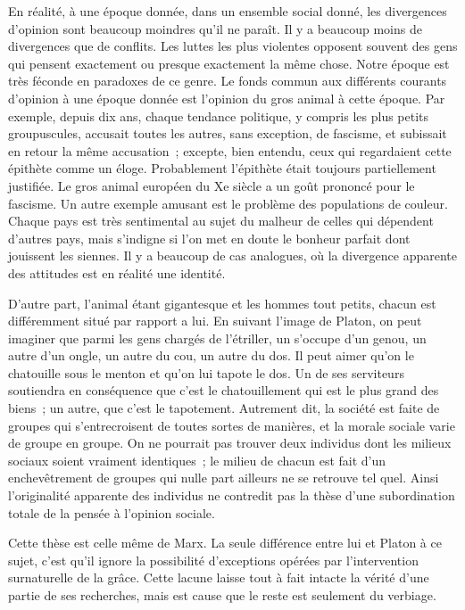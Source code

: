 \documentclass[french,twoside]{book} %
\begin{document}
En réalité, à une époque donnée, dans un ensemble social donné, les divergences d'opinion sont beaucoup moindres qu'il ne paraît. Il y a beaucoup moins de divergences que de conflits. Les luttes les plus violentes opposent souvent des gens qui pensent exactement ou presque exactement la même chose. Notre époque est très féconde en paradoxes de ce genre. Le fonds commun aux différents courants d'opinion à une époque donnée est l'opinion du gros animal à cette époque. Par exemple, depuis dix ans, chaque tendance politique, y compris les plus petits groupuscules, accusait toutes les autres, sans exception, de fascisme, et subissait en retour la même accusation ; excepte, bien entendu, ceux qui regardaient cette épithète comme un éloge. Probablement l'épithète était toujours partiellement justifiée. Le gros animal européen du Xe siècle a un goût prononcé pour le fascisme. Un autre exemple amusant est le problème des populations de couleur. Chaque pays est très sentimental au sujet du malheur de celles qui dépendent d'autres pays, mais s'indigne si l'on met en doute le bonheur parfait dont jouissent les siennes. Il y a beaucoup de cas analogues, où la divergence apparente des attitudes est en réalité une identité.\par
D'autre part, l'animal étant gigantesque et les hommes tout petits, chacun est différemment situé par rapport a lui. En suivant l'image de Platon, on peut imaginer que parmi les gens chargés de l'étriller, un s'occupe d'un genou, un autre d'un ongle, un autre du cou, un autre du dos. Il peut aimer qu'on le chatouille sous le menton et qu'on lui tapote le dos. Un de ses serviteurs soutiendra en conséquence que c'est le chatouillement qui est le plus grand des biens ; un autre, que c'est le tapotement. Autrement dit, la société est faite de groupes qui s'entrecroisent de toutes sortes de manières, et la morale sociale varie de groupe en groupe. On ne pourrait pas trouver deux individus dont les milieux sociaux soient vraiment identiques ; le milieu de chacun est fait d'un enchevêtrement de groupes qui nulle part ailleurs ne se retrouve tel quel. Ainsi l'originalité apparente des individus ne contredit pas la thèse d'une subordination totale de la pensée à l'opinion sociale.\par
Cette thèse est celle même de Marx. La seule différence entre lui et Platon à ce sujet, c'est qu'il ignore la possibilité d'exceptions opérées par l'intervention surnaturelle de la grâce. Cette lacune laisse tout à fait intacte la vérité d'une partie de ses recherches, mais est cause que le reste est seulement du verbiage.\par
\end{document}
